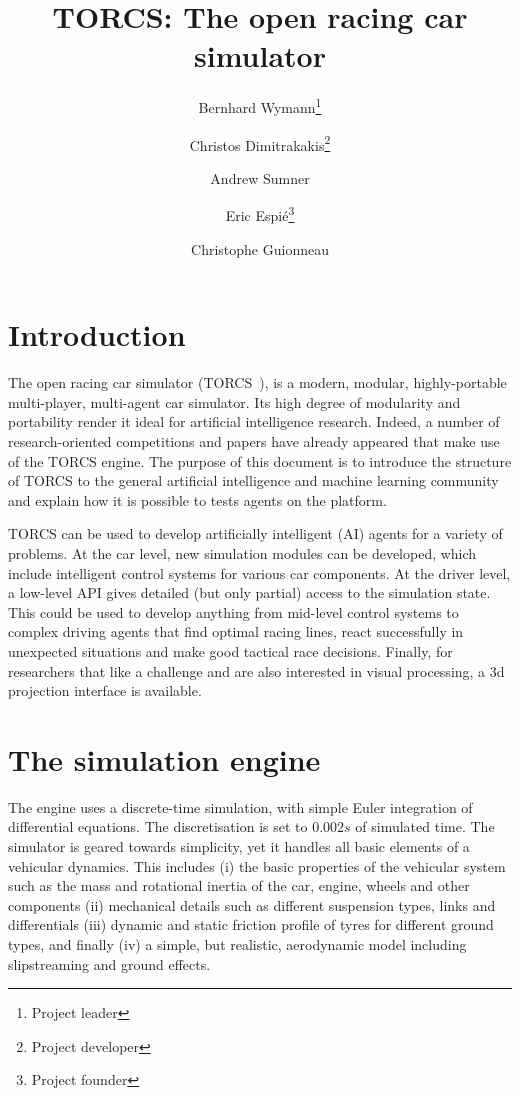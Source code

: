 \documentclass[a4paper]{article}
\title{TORCS: The open racing car simulator}
\author{Bernhard Wymann\footnote{Project leader} \and Christos Dimitrakakis\footnote{Project developer} \and Andrew Sumner\footnotemark[2] \and Eric Espi\'e\footnote{Project founder} \and Christophe Guionneau\footnotemark[3]}
\begin{document}
\maketitle

\section{Introduction}

The open racing car simulator (TORCS~\cite{TORCS}), is a modern, modular, highly-portable multi-player, multi-agent car simulator. Its high degree of modularity and portability render it ideal for artificial intelligence research. Indeed, a number of research-oriented competitions and papers have already appeared that make use of the TORCS engine. The purpose of this document is to introduce the structure of TORCS to the general artificial intelligence and machine learning community and explain how it is possible to tests agents on the platform.

TORCS can be used to develop artificially intelligent (AI) agents for a variety of problems. At the car level, new simulation modules can be developed, which include intelligent control systems for various car components. At the driver level, a low-level API gives detailed (but only partial) access to the simulation state. This could be used to develop anything from mid-level control systems to complex driving agents that find optimal racing lines, react successfully in unexpected situations and make good tactical race decisions. Finally, for researchers that like a challenge and are also interested in visual processing, a 3d projection interface is available.

\section{The simulation engine}

The engine uses a discrete-time simulation, with simple Euler integration of differential equations. The discretisation is set to $0.002s$ of simulated time. The simulator is geared towards simplicity, yet it handles all basic elements of a vehicular dynamics.
This includes (i) the basic properties of the vehicular system such as the mass and rotational inertia of the car, engine, wheels and other components  (ii) mechanical details such as different suspension types, links and differentials (iii) dynamic and static friction profile of tyres for different ground types, and finally (iv) a simple, but realistic, aerodynamic model including slipstreaming and ground effects.
\end{document}
